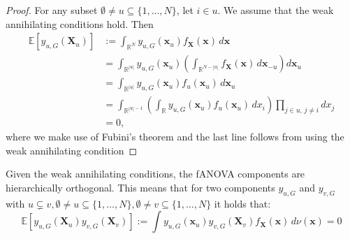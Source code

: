 \begin{proof}
For any subset $\emptyset \ne u \subseteq \{1, \ldots, N\}$, let $i \in u$. We assume that the weak annihilating conditions hold. Then
\begin{align*}
\mathbb{E}[y_{u,G}(\mathbf{X}_u)] 
&:= \int_{\mathbb{R}^N} y_{u,G}(\mathbf{x}_u) f_{\mathbf{X}}(\mathbf{x})\, d\mathbf{x} \\
&= \int_{\mathbb{R}^{|u|}} y_{u,G}(\mathbf{x}_u) \left( \int_{\mathbb{R}^{N - |u|}} f_{\mathbf{X}}(\mathbf{x}) \, d\mathbf{x}_{-u} \right) d\mathbf{x}_u \\
&= \int_{\mathbb{R}^{|u|}} y_{u,G}(\mathbf{x}_u) f_u(\mathbf{x}_u)\, d\mathbf{x}_u \\
&= \int_{\mathbb{R}^{|u| - 1}} \left( \int_{\mathbb{R}} y_{u,G}(\mathbf{x}_u) f_u(\mathbf{x}_u) \, dx_i \right) \prod_{j \in u,\, j \ne i} dx_j \\
&= 0,
\end{align*}
where we make use of Fubini's theorem and the last line follows from using the weak annihilating condition %
\end{proof}

\begin{proposition}
    Given the weak annihilating conditions, the fANOVA components are hierarchically orthogonal. This means that for two components $y_{u, G}$ and $y_{v, G}$ with $u \subsetneq v, \emptyset \neq u \subseteq \{1, \ldots, N\}, \emptyset \neq v \subseteq \{1, \ldots, N\} $ it holds that:
\begin{equation}
    \mathbb{E}[y_{u, G}(\boldsymbol{X}_u)y_{v, G}(\boldsymbol{X}_v)] := \int y_{u, G}(\boldsymbol{x}_u) y_{v, G}(\boldsymbol{X}_v) f_{\boldsymbol{X}}(\boldsymbol{x}) \, d\nu (\boldsymbol{x}) = 0
\end{equation}
\label{eq:orthogonality_g}
\end{proposition}

